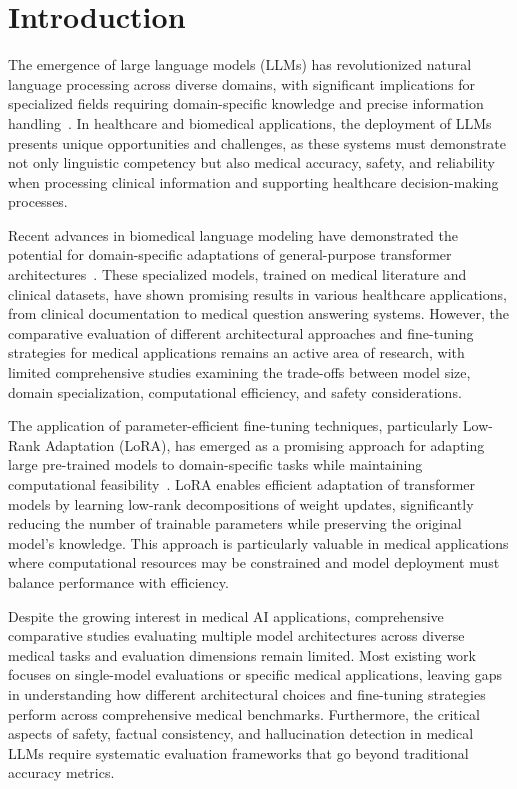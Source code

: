 \documentclass[conference]{IEEEtran}
\begin{document}
\section{Introduction}

The emergence of large language models (LLMs) has revolutionized natural language processing across diverse domains, with significant implications for specialized fields requiring domain-specific knowledge and precise information handling~\cite{brown2020language}. In healthcare and biomedical applications, the deployment of LLMs presents unique opportunities and challenges, as these systems must demonstrate not only linguistic competency but also medical accuracy, safety, and reliability when processing clinical information and supporting healthcare decision-making processes.

Recent advances in biomedical language modeling have demonstrated the potential for domain-specific adaptations of general-purpose transformer architectures~\cite{li2022biogpt,singhal2023large}. These specialized models, trained on medical literature and clinical datasets, have shown promising results in various healthcare applications, from clinical documentation to medical question answering systems. However, the comparative evaluation of different architectural approaches and fine-tuning strategies for medical applications remains an active area of research, with limited comprehensive studies examining the trade-offs between model size, domain specialization, computational efficiency, and safety considerations.

The application of parameter-efficient fine-tuning techniques, particularly Low-Rank Adaptation (LoRA), has emerged as a promising approach for adapting large pre-trained models to domain-specific tasks while maintaining computational feasibility~\cite{hu2021lora}. LoRA enables efficient adaptation of transformer models by learning low-rank decompositions of weight updates, significantly reducing the number of trainable parameters while preserving the original model's knowledge. This approach is particularly valuable in medical applications where computational resources may be constrained and model deployment must balance performance with efficiency.

Despite the growing interest in medical AI applications, comprehensive comparative studies evaluating multiple model architectures across diverse medical tasks and evaluation dimensions remain limited. Most existing work focuses on single-model evaluations or specific medical applications, leaving gaps in understanding how different architectural choices and fine-tuning strategies perform across comprehensive medical benchmarks. Furthermore, the critical aspects of safety, factual consistency, and hallucination detection in medical LLMs require systematic evaluation frameworks that go beyond traditional accuracy metrics.
\end{document}
